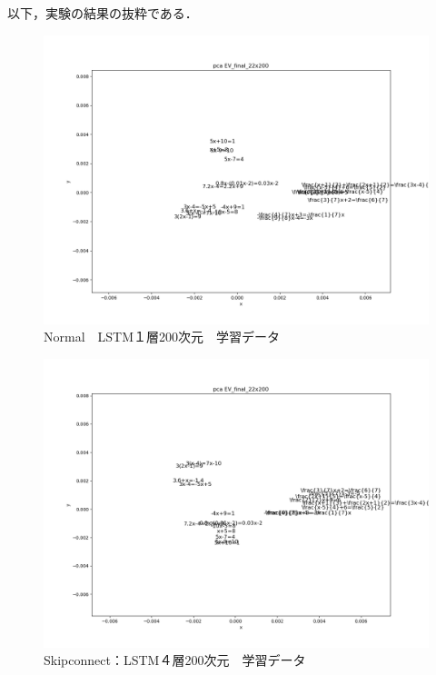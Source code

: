 \documentclass[a4paper,twocolumn]{jsarticle}
\begin{document}
以下，実験の結果の抜粋である．

\begin{center}
  \begin{figure}[tb]
    \centering
    \includegraphics[width=0.7\linewidth]{image/pca_formula_EV_final_22x200_1_Wed_Feb_06_03:50:09.png}
    \caption{Normal　LSTM１層200次元　学習データ}
    \label{fig:Simple}
  \end{figure}
\end{center}

\begin{center}
  \begin{figure}[tb]
    \centering
    \includegraphics[width=0.7\linewidth]{image/pca_formula_EV_final_22x200_1_Wed_Feb_06_04:42:56.png}
    \caption{Skipconnect：LSTM４層200次元　学習データ}
    \label{fig:Skip4layer}
  \end{figure}
\end{center}
\end{document}
